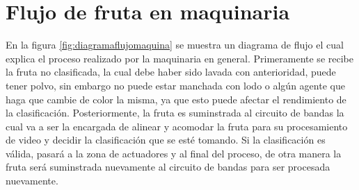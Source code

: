 \documentclass[twoside,spanish,ESP,MSc]{plantillaLabUPV}
\theoremstyle{definition}
\begin{document}
\section{Flujo de fruta en maquinaria}

En la figura \ref{fig:diagramaflujomaquina} se muestra un diagrama de flujo el cual explica el proceso realizado por la maquinaria en general. Primeramente se recibe la fruta no clasificada, la cual debe haber sido lavada con anterioridad, puede tener polvo, sin embargo no puede estar manchada con lodo o algún agente que haga que cambie de color la misma, ya que esto puede afectar el rendimiento de la clasificación. Posteriormente, la fruta es suminstrada al circuito de bandas la cual va a ser la encargada de alinear y acomodar la fruta para su procesamiento de video y decidir la clasificación que se esté tomando. Si la clasificación es válida, pasará a la zona de actuadores y al final del proceso, de otra manera la fruta será suminstrada nuevamente al circuito de bandas para ser procesada nuevamente.
\end{document}
